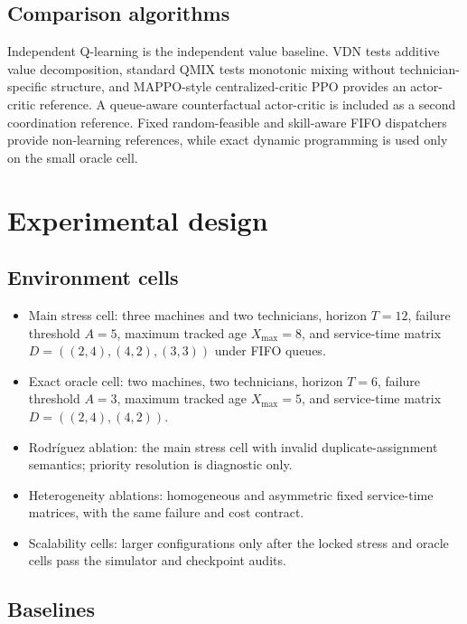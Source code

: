\documentclass[11pt]{article}
\begin{document}
\subsection{Comparison algorithms}

Independent Q-learning is the independent value baseline. VDN tests additive value decomposition, standard QMIX tests monotonic mixing without technician-specific structure, and MAPPO-style centralized-critic PPO provides an actor-critic reference. A queue-aware counterfactual actor-critic is included as a second coordination reference. Fixed random-feasible and skill-aware FIFO dispatchers provide non-learning references, while exact dynamic programming is used only on the small oracle cell.

\section{Experimental design}

\subsection{Environment cells}

\begin{itemize}[leftmargin=*]
    \item Main stress cell: three machines and two technicians, horizon $T=12$, failure threshold $A=5$, maximum tracked age $X_{\max}=8$, and service-time matrix $D=((2,4),(4,2),(3,3))$ under FIFO queues.
    \item Exact oracle cell: two machines, two technicians, horizon $T=6$, failure threshold $A=3$, maximum tracked age $X_{\max}=5$, and service-time matrix $D=((2,4),(4,2))$.
    \item Rodríguez ablation: the main stress cell with invalid duplicate-assignment semantics; priority resolution is diagnostic only.
    \item Heterogeneity ablations: homogeneous and asymmetric fixed service-time matrices, with the same failure and cost contract.
    \item Scalability cells: larger configurations only after the locked stress and oracle cells pass the simulator and checkpoint audits.
\end{itemize}

\subsection{Baselines}
\end{document}
